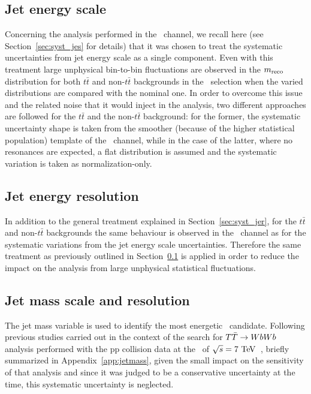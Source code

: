 \subsection{Jet energy scale}\label{sec:wbx_syst_jes}
Concerning the analysis performed in the \tight\ channel,
we recall here (see Section~\ref{sec:syst_jes} for details)
that it was chosen to treat the systematic uncertainties from
jet energy scale as a single component. Even with this treatment
large unphysical bin-to-bin fluctuations are observed
in the $m_{\rm reco}$ distribution for both $t\bar{t}$ and non-$t\bar{t}$
backgrounds in the \tight\ selection when the varied distributions
are compared with the nominal one. In order to overcome this issue
and the related noise that it would inject in the analysis, two different
approaches are followed for the $t\bar{t}$ and the non-$t\bar{t}$ background:
for the former, the systematic uncertainty shape is taken from the smoother
(because of the higher statistical population) template of the \loose\
channel, while in the case of the latter, where no resonances are expected,
a flat distribution is assumed and the systematic variation is taken as
normalization-only.

\subsection{Jet energy resolution}
In addition to the general treatment explained in Section~\ref{sec:syst_jer},
for the $t\bar{t}$ and non-$t\bar{t}$ backgrounds 
the same behaviour is observed in the \tight\ channel
as for the systematic variations from the jet energy scale uncertainties.
Therefore the same treatment as previously outlined in 
Section~\ref{sec:wbx_syst_jes} is applied in order to 
reduce the impact on the analysis from
large unphysical statistical fluctuations.

\subsection{Jet mass scale and resolution}
The jet mass variable is used to identify the most 
energetic \wi\ candidate.
Following previous studies carried out in 
the context of the search for $\TTbar\to WbWb$
analysis performed with the pp collision data
at the \cme\ of $\sqrt{s}=7\tev$~\cite{ATLAS:2012qe},
briefly summarized in Appendix~\ref{app:jetmass},
given the small impact on the sensitivity of 
that analysis and since it was judged to be a 
conservative uncertainty at the time, 
this systematic uncertainty is neglected.

